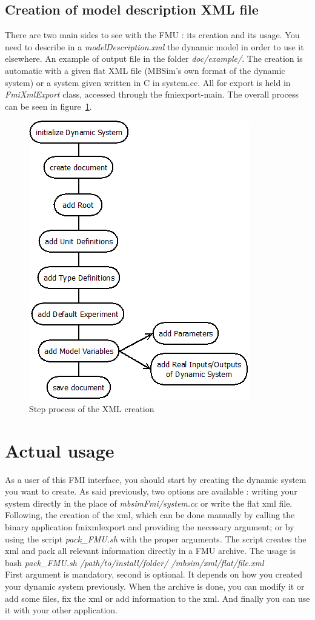 \documentclass[10pt,a4paper]{report}
\begin{document}
\subsection*{Creation of model description XML file}
There are two main sides to see with the FMU : its creation and its usage. You need to describe in a \emph{modelDescription.xml} the dynamic model in order to use it elsewhere. An example of output file in the folder \textit{doc/example/}. The creation is automatic with a given flat XML file (MBSim's own format of the dynamic system) or a system given written in C in system.cc. All for export is held in \emph{FmiXmlExport} class, accessed through the fmiexport-main. The overall process can be seen in figure~\ref{fig:fmiexport}.
%
\begin{figure}[!h]
	\centering
	\includegraphics[scale=0.6]{fmiexport}
	\caption{Step process of the XML creation}
	\label{fig:fmiexport}
\end{figure}
%
\section{Actual usage}
As a user of this FMI interface, you should start by creating the dynamic system you want to create. As said previously, two options are available : writing your system directly in the place of \emph{mbsimFmi/system.cc} or write the flat xml file. \\
Following, the creation of the xml, which can be done manually by calling the binary application fmixmlexport and providing the necessary argument; or by using the script \emph{pack\_FMU.sh} with the proper arguments. The script creates the xml and pack all relevant information directly in a FMU archive. The usage is \\ 
bash \emph{pack\_FMU.sh /path/to/install/folder/ /mbsim/xml/flat/file.xml} \\
First argument is mandatory, second is optional. It depends on how you created your dynamic system previously. When the archive is done, you can modify it or add some files, fix the xml or add information to the xml. And finally you can use it with your other application.
%
\end{document}
